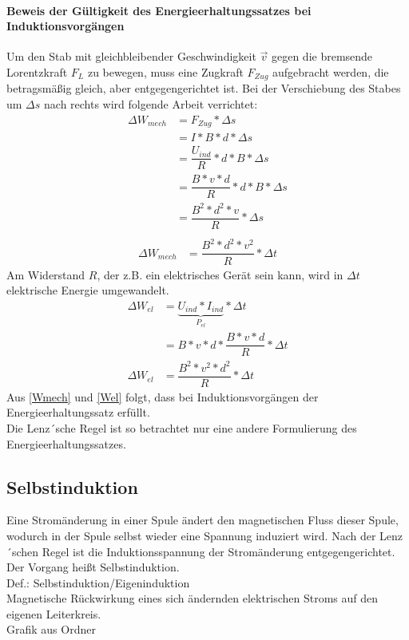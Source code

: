 \documentclass[12 pt]{article}
\numberwithin{equation}{section}
\begin{document}
	\paragraph{Beweis der Gültigkeit des Energieerhaltungssatzes bei Induktionsvorgängen} Um den Stab mit gleichbleibender Geschwindigkeit $\vec{v}$ gegen die bremsende Lorentzkraft $F_L$ zu bewegen, muss eine Zugkraft $F_{Zug}$ aufgebracht werden, die betragsmäßig gleich, aber entgegengerichtet ist.
	Bei der Verschiebung des Stabes um $\Delta s$ nach rechts wird folgende Arbeit verrichtet:\\
	\begin{align*}
		\Delta W_{mech} &= F_{Zug}*\Delta s\\
		&=I*B*d*\Delta s\\
		&=\dfrac{U_{ind}}{R}*d*B*\Delta s\\
		&=\dfrac{B*v*d}{R}*d*B*\Delta s\\
		&=\dfrac{B^2*d^2*v}{R}*\Delta s\\
	\end{align*}
	\begin{align}
		\Delta W_{mech}&=\dfrac{B^2*d^2*v^2}{R}*\Delta t\label{Wmech}
	\end{align}
	Am Widerstand $R$, der z.B. ein elektrisches Gerät sein kann, wird in $\Delta t$ elektrische Energie umgewandelt.
	\begin{align}
		\Delta W_{el} &= \underbrace{U_{ind} * I_{ind}}_{P_{el}}*\Delta t\nonumber\\
		&=B*v*d*\dfrac{B*v*d}{R}*\Delta t\nonumber\\
		\Delta W_{el}&=\dfrac{B^2*v^2*d^2}{R}*\Delta t\label{Wel}
	\end{align}
	Aus \ref{Wmech} und \ref{Wel} folgt, dass bei Induktionsvorgängen der Energieerhaltungssatz erfüllt.\\
	Die Lenz´sche Regel ist so betrachtet nur eine andere Formulierung des Energieerhaltungssatzes.
	\subsection{Selbstinduktion}
	Eine Stromänderung in einer Spule ändert den magnetischen Fluss dieser Spule, wodurch in der Spule selbst wieder eine Spannung induziert wird. Nach der Lenz´schen Regel ist die Induktionsspannung der Stromänderung entgegengerichtet. Der Vorgang heißt Selbstinduktion.\\
	Def.: Selbstinduktion/Eigeninduktion\\
	Magnetische Rückwirkung eines sich ändernden elektrischen Stroms auf den eigenen Leiterkreis.\\
	Grafik aus Ordner\\
\end{document}
